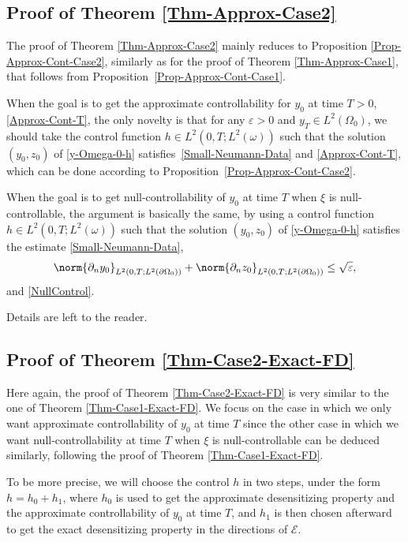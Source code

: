 \subsection{Proof of Theorem \ref{Thm-Approx-Case2}}\label{Subsec-Proof-Approx-Case2}

The proof of Theorem \ref{Thm-Approx-Case2} mainly reduces to Proposition \ref{Prop-Approx-Cont-Case2}, similarly as for the proof of Theorem \ref{Thm-Approx-Case1}, that follows from Proposition~\ref{Prop-Approx-Cont-Case1}.

When the goal is to get the approximate controllability for $y_0$ at time $T>0$, \ie \eqref{Approx-Cont-T}, the only novelty is that for any $\varepsilon >0$ and $y_T\in L^2(\Omega_0)$, we should take the control function $h \in L^2(0,T; L^2(\omega))$ such that the solution $(y_0,z_0)$ of \eqref{y-Omega-0-h} satisfies~\eqref{Small-Neumann-Data} and \eqref{Approx-Cont-T}, which can be done according to Proposition~\ref{Prop-Approx-Cont-Case2}.

When the goal is to get null-controllability of $y_0$ at time $T$ when $\xi$ is null\nobreakdash-con\-trol\-lable, the argument is basically the same, by using a control function $h \in L^2(0,T; L^2(\omega))$ such that the solution $(y_0,z_0)$ of \eqref{y-Omega-0-h} satisfies the estimate \eqref{Small-Neumann-Data}, \ie
\[
\norm{\partial_n y_0}_{L^2(0,T;L^2(\partial\Omega_0))} + \norm{\partial_n z_0}_{L^2(0,T;L^2(\partial\Omega_0))}\leq \sqrt{\varepsilon}
,
\]
and \eqref{NullControl}.

Details are left to the reader.

\subsection{Proof of Theorem \ref{Thm-Case2-Exact-FD}}

Here again, the proof of Theorem \ref{Thm-Case2-Exact-FD} is very similar to the one of Theorem \ref{Thm-Case1-Exact-FD}. We focus on the case in which we only want approximate controllability of $y_0$ at time $T$ since the other case in which we want null-controllability at time $T$ when $\xi$ is null-controllable can be deduced similarly, following the proof of Theorem \ref{Thm-Case1-Exact-FD}.

{To be more precise, we will choose the control $h$ in two steps, under the form $h = h_0 + h_1$, where $h_0$ is used to get the approximate desensitizing property and the approximate controllability of $y_0$ at time $T$, and $h_1$ is then chosen afterward to get the exact desensitizing property in the directions of $\mathcal{E}$.}

